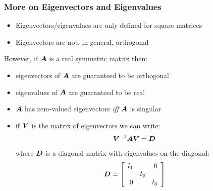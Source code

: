 \documentclass{beamer}
\begin{document}
\begin{frame}
  \frametitle{More on Eigenvectors and Eigenvalues}

\begin{itemize}
 	\item Eigenvectors/eigenvalues are only defined for square matrices
	\item Eigenvectors are not, in general, orthogonal
\end{itemize}
\smallskip

However, if $\bm{A}$ is a real symmetric matrix then:
\begin{itemize}
	\item eigenvectors of $\bm{A}$ are guaranteed to be orthogonal
	\item eigenvalues of $\bm{A}$ are guaranteed to be real
	\item $\bm{A}$ has zero-valued eigenvectors \emph{iff} $\bm{A}$ is singular
	\item if $\bm{V}$ is the matrix of eigenvectors we can write:
\[
	\bm{V}^{-1} \bm{A} \bm{V} = \bm{D}
\]
where $\bm{D}$ is a diagonal matrix with eigenvalues on the diagonal:
\footnotesize{
\[\bm{D} = 
 \left[ \begin{array}{rrr}
l_1 &  & 0 \\
       & l_2 & \\
 0      &        &  l_3\\
\end{array}
\right]
\]
} %

\end{itemize}



\end{frame}
\end{document}
